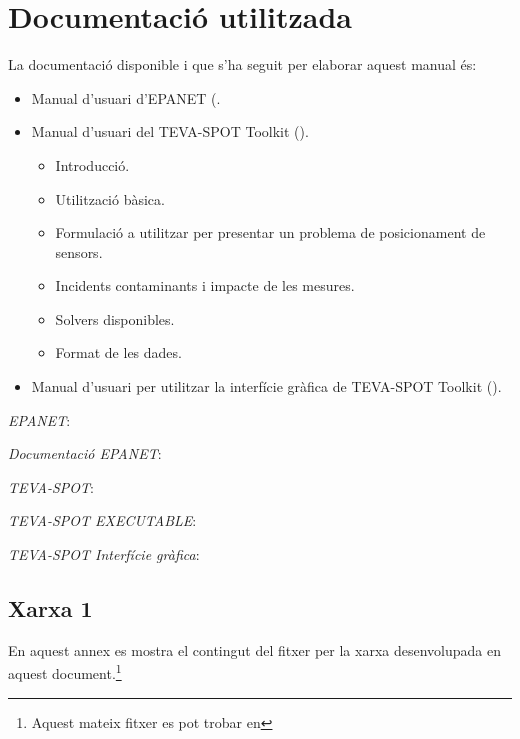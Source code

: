 \documentclass[12pt]{article}
\begin{document}
\clearpage
\section{Documentació utilitzada}
La documentació disponible i que s'ha seguit per elaborar aquest manual és:
\begin{itemize}
	\item Manual d'usuari d'EPANET (.
	\item Manual d'usuari del TEVA-SPOT Toolkit ().
	\begin{itemize}
		\item Introducció.
		\item Utilització bàsica.
		\item Formulació a utilitzar per presentar un problema de posicionament de sensors.
		\item Incidents contaminants i impacte de les mesures.
		\item Solvers disponibles.
		\item Format de les dades.
	\end{itemize}
	\item Manual d'usuari per utilitzar la interfície gràfica de TEVA-SPOT Toolkit ().
\end{itemize}




\clearpage
\begin{thebibliography}{9}
	\textit{EPANET}:
  	\\
  	
  	\textit{Documentació EPANET}:
  	\\
  	
	\textit{TEVA-SPOT}:
  	\\

  	\textit{TEVA-SPOT EXECUTABLE}:
  	\\

	\textit{TEVA-SPOT Interfície gràfica}:
  	\\
\end{thebibliography}

\clearpage
\begin{appendices}
\section{Xarxa 1\label{ann1}}
En aquest annex es mostra el contingut del fitxer per la xarxa desenvolupada en aquest document.\footnote{Aquest mateix fitxer es pot trobar en }

\end{appendices}
\end{document}
